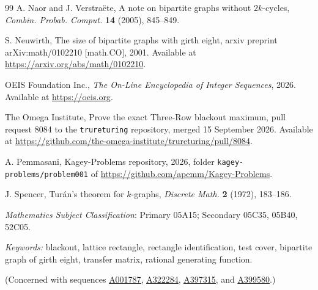 \documentclass[12pt]{article}
\theoremstyle{plain}
\theoremstyle{definition}
\theoremstyle{remark}
\newcommand{\seqnum}[1]{\href{https://oeis.org/#1}{\rm \underline{#1}}}
\begin{document}
\begin{thebibliography}{99}
A. Naor and J. Verstra\"ete, A note on bipartite graphs without $2k$-cycles,
\emph{Combin. Probab. Comput.} \textbf{14} (2005), 845--849.

S. Neuwirth, The size of bipartite graphs with girth eight, arxiv preprint
arXiv:math/0102210 [math.CO], 2001. Available at
\url{https://arxiv.org/abs/math/0102210}.

OEIS Foundation Inc., \emph{The On-Line Encyclopedia of Integer Sequences}, 2026.
Available at \url{https://oeis.org}.

The Omega Institute, Prove the exact Three-Row blackout maximum, pull request 8084 to
the \texttt{trureturing} repository, merged 15 September 2026. Available at
\url{https://github.com/the-omega-institute/trureturing/pull/8084}.

A. Pemmasani, Kagey-Problems repository, 2026, folder
\texttt{kagey-problems/problem001} of \url{https://github.com/apemm/Kagey-Problems}.

J. Spencer, Tur\'an's theorem for $k$-graphs, \emph{Discrete Math.} \textbf{2} (1972),
183--186.

\end{thebibliography}

 {\it Mathematics Subject Classification}: Primary 05A15; Secondary
05C35, 05B40, 52C05.

\noindent \emph{Keywords:} blackout, lattice rectangle, rectangle identification, test
cover, bipartite graph of girth eight, transfer matrix, rational generating function.

\noindent (Concerned with sequences
\seqnum{A001787},
\seqnum{A322284},
\seqnum{A397315}, and
\seqnum{A399580}.)
\end{document}
